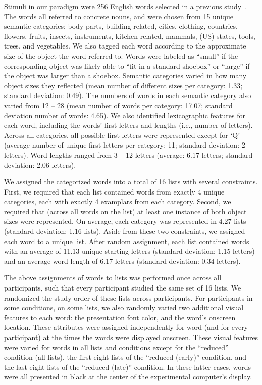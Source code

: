 \documentclass[11pt]{article}
\begin{document}
Stimuli in our paradigm were 256 English words selected in a previous
study~\citep{ZimaEtal18}. The words all referred to concrete nouns, and were
chosen from 15 unique semantic categories: body parts, building-related,
cities, clothing, countries, flowers, fruits, insects, instruments,
kitchen-related, mammals, (US) states, tools, trees, and vegetables. We also
tagged each word according to the approximate size of the object the word
referred to. Words were labeled as ``small'' if the corresponding object was
likely able to ``fit in a standard shoebox'' or ``large'' if the object was
larger than a shoebox. Semantic categories varied in how many object sizes they
reflected (mean number of different sizes per category: 1.33; standard
deviation: 0.49). The numbers of words in each semantic category also varied
from 12 -- 28 (mean number of words per category: 17.07; standard deviation
number of words: 4.65). We also identified lexicographic features for each
word, including the words' first letters and lengths (i.e., number of letters).
Across all categories, all possible first letters were represented except for
`Q' (average number of unique first letters per category: 11; standard
deviation: 2 letters). Word lengths ranged from 3 -- 12 letters (average: 6.17
letters; standard deviation: 2.06 letters).

We assigned the categorized words into a total of 16 lists with several
constraints. First, we required that each list contained words from exactly 4
unique categories, each with exactly 4 examplars from each category. Second, we
required that (across all words on the list) at least one instance of both
object sizes were represented. On average, each category was represented in
4.27 lists (standard deviation: 1.16 lists). Aside from these two constraints,
we assigned each word to a unique list. After random assignment, each list
contained words with an average of 11.13 unique starting letters (standard
deviation: 1.15 letters) and an average word length of 6.17 letters (standard
deviation: 0.34 letters).

The above assignments of words to lists was performed once across all
participants, such that every participant studied the same set of 16 lists. We
randomized the study order of these lists across participants. For participants
in some conditions, on some lists, we also randomly varied two additional
visual features to each word: the presentation font color, and the word's
onscreen location. These attributes were assigned independently for word (and
for every participant) at the times the words were displayed onscreen. These
visual features were varied for words in all lists and conditions except for
the ``reduced'' condition (all lists), the first eight lists of the ``reduced
(early)'' condition, and the last eight lists of the ``reduced (late)''
condition. In these latter cases, words were all presented in black at the
center of the experimental computer's display.
\end{document}
